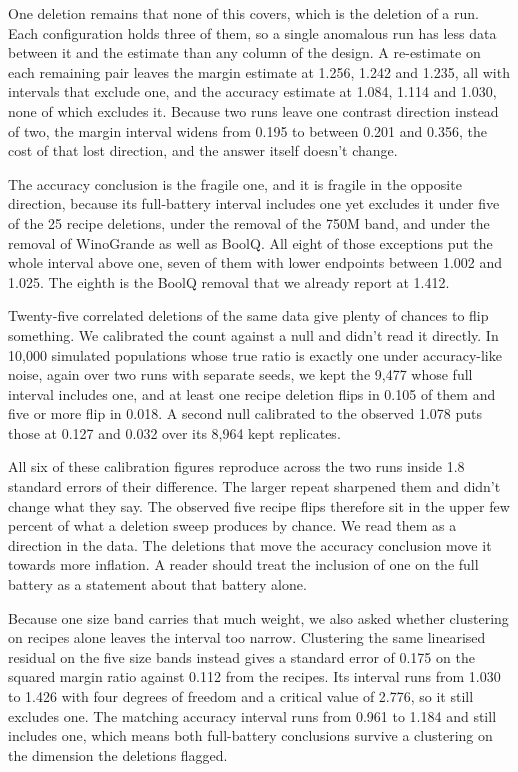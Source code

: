 One deletion remains that none of this covers, which is the deletion of a run. Each configuration holds three of them, so a single anomalous run has less data between it and the estimate than any column of the design. A re-estimate on each remaining pair leaves the margin estimate at 1.256, 1.242 and 1.235, all with intervals that exclude one, and the accuracy estimate at 1.084, 1.114 and 1.030, none of which excludes it. Because two runs leave one contrast direction instead of two, the margin interval widens from 0.195 to between 0.201 and 0.356, the cost of that lost direction, and the answer itself doesn't change.

The accuracy conclusion is the fragile one, and it is fragile in the opposite direction, because its full-battery interval includes one yet excludes it under five of the 25 recipe deletions, under the removal of the 750M band, and under the removal of WinoGrande as well as BoolQ. All eight of those exceptions put the whole interval above one, seven of them with lower endpoints between 1.002 and 1.025. The eighth is the BoolQ removal that we already report at 1.412.

Twenty-five correlated deletions of the same data give plenty of chances to flip something. We calibrated the count against a null and didn't read it directly. In 10,000 simulated populations whose true ratio is exactly one under accuracy-like noise, again over two runs with separate seeds, we kept the 9,477 whose full interval includes one, and at least one recipe deletion flips in 0.105 of them and five or more flip in 0.018. A second null calibrated to the observed 1.078 puts those at 0.127 and 0.032 over its 8,964 kept replicates.

All six of these calibration figures reproduce across the two runs inside 1.8 standard errors of their difference. The larger repeat sharpened them and didn't change what they say. The observed five recipe flips therefore sit in the upper few percent of what a deletion sweep produces by chance. We read them as a direction in the data. The deletions that move the accuracy conclusion move it towards more inflation. A reader should treat the inclusion of one on the full battery as a statement about that battery alone.

Because one size band carries that much weight, we also asked whether clustering on recipes alone leaves the interval too narrow. Clustering the same linearised residual on the five size bands instead gives a standard error of 0.175 on the squared margin ratio against 0.112 from the recipes. Its interval runs from 1.030 to 1.426 with four degrees of freedom and a critical value of 2.776, so it still excludes one. The matching accuracy interval runs from 0.961 to 1.184 and still includes one, which means both full-battery conclusions survive a clustering on the dimension the deletions flagged.

